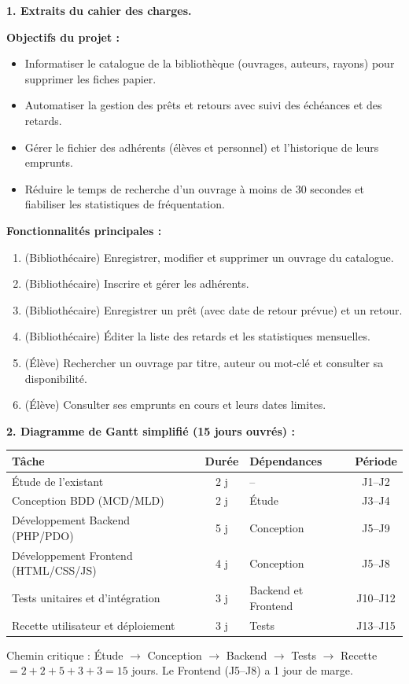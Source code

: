 \documentclass[11pt]{article}
\begin{document}
\begin{corrige}
\textbf{1. Extraits du cahier des charges.}

\textbf{Objectifs du projet :}
\begin{itemize}
    \item Informatiser le catalogue de la bibliothèque (ouvrages, auteurs, rayons) pour supprimer les fiches papier.
    \item Automatiser la gestion des prêts et retours avec suivi des échéances et des retards.
    \item Gérer le fichier des adhérents (élèves et personnel) et l'historique de leurs emprunts.
    \item Réduire le temps de recherche d'un ouvrage à moins de 30 secondes et fiabiliser les statistiques de fréquentation.
\end{itemize}

\textbf{Fonctionnalités principales :}
\begin{enumerate}
    \item (Bibliothécaire) Enregistrer, modifier et supprimer un ouvrage du catalogue.
    \item (Bibliothécaire) Inscrire et gérer les adhérents.
    \item (Bibliothécaire) Enregistrer un prêt (avec date de retour prévue) et un retour.
    \item (Bibliothécaire) Éditer la liste des retards et les statistiques mensuelles.
    \item (Élève) Rechercher un ouvrage par titre, auteur ou mot-clé et consulter sa disponibilité.
    \item (Élève) Consulter ses emprunts en cours et leurs dates limites.
\end{enumerate}

\textbf{2. Diagramme de Gantt simplifié (15 jours ouvrés) :}
\begin{center}
\begin{tabularx}{\linewidth}{|X|c|l|c|}\hline
\rowcolor{popblueL} \textbf{Tâche} & \textbf{Durée} & \textbf{Dépendances} & \textbf{Période} \\\hline
Étude de l'existant & 2 j & -- & J1--J2 \\\hline
Conception BDD (MCD/MLD) & 2 j & Étude & J3--J4 \\\hline
Développement Backend (PHP/PDO) & 5 j & Conception & J5--J9 \\\hline
Développement Frontend (HTML/CSS/JS) & 4 j & Conception & J5--J8 \\\hline
Tests unitaires et d'intégration & 3 j & Backend et Frontend & J10--J12 \\\hline
Recette utilisateur et déploiement & 3 j & Tests & J13--J15 \\\hline
\end{tabularx}
\end{center}
Chemin critique : Étude $\to$ Conception $\to$ Backend $\to$ Tests $\to$ Recette $= 2+2+5+3+3 = 15$ jours. Le Frontend (J5--J8) a 1 jour de marge.


\end{corrige}
\end{document}
